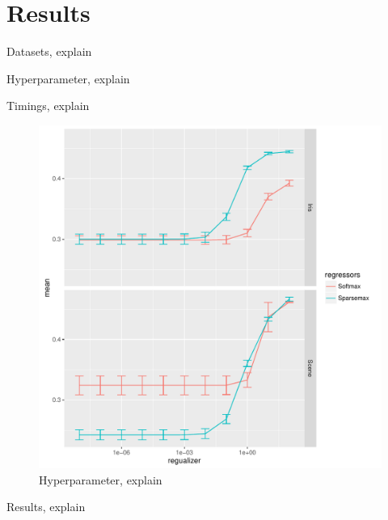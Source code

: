 \section{Results}


\begin{table}[H]
\centering

\caption{Datasets, explain}
\end{table}


\begin{table}[H]
\centering

\caption{Hyperparameter, explain}
\end{table}


\begin{table}
\centering

\caption{Timings, explain}
\end{table}

\begin{figure}[H]
	\centering
	\includegraphics[width=\columnwidth]{figures/hyperparameter.pdf}
\caption{Hyperparameter, explain}
\end{figure}


\begin{table}[H]
\centering

\caption{Results, explain}
\end{table}

